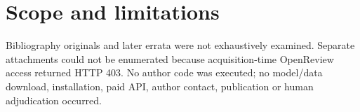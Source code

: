 \documentclass[10pt]{article}
\begin{document}
\section*{Scope and limitations}
Bibliography originals and later errata were not exhaustively examined. Separate attachments could not be enumerated because acquisition-time OpenReview access returned HTTP 403. No author code was executed; no model/data download, installation, paid API, author contact, publication or human adjudication occurred.\par
\end{document}
